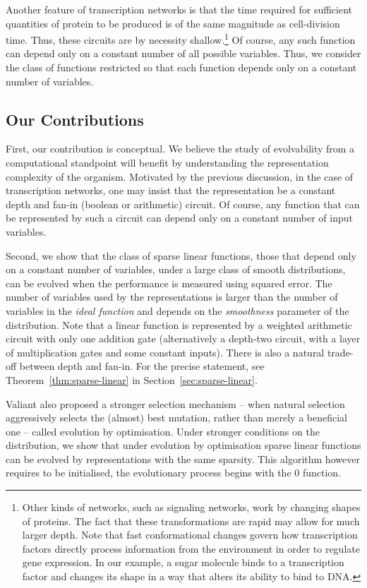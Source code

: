 Another feature of transcription networks is that the time required for
sufficient quantities of protein to be produced is of the same magnitude as
cell-division time. Thus, these circuits are by necessity
shallow.\footnote{Other kinds of networks, such as signaling networks, work by
changing shapes of proteins. The fact that these transformations are rapid may
allow for much larger depth.
Note that fast conformational changes govern how transcription factors directly
process information from the environment in order to regulate gene expression.
In our example, a sugar molecule binds to a transcription factor and changes
its shape in a way that alters its ability to bind to DNA.}
Of course, any such function can depend only on a
constant number of all possible variables. Thus, we consider the class of
functions restricted so that each function depends only on a constant number of
variables.

\subsection{Our Contributions}

First, our contribution is conceptual. We believe the study of evolvability from
a computational standpoint will benefit by understanding the representation
complexity of the organism. Motivated by the previous discussion, in the case of
transcription networks, one may insist that the representation be a
constant depth and fan-in (boolean or arithmetic) circuit. Of course, any
function that can be represented by such a circuit can depend only on a constant
number of input variables.

Second, we show that the class of sparse linear functions, those that depend
only on a constant number of variables, under a large class of smooth
distributions, can be evolved when the performance is
measured using squared error. The number of variables used by the
representations is larger than the number of variables in the \emph{ideal
function} and depends on the \emph{smoothness} parameter of the distribution.
Note that a linear function is represented by a weighted arithmetic circuit with
only one addition gate (alternatively a depth-two circuit, with a layer of
multiplication gates and some constant inputs). There is also a natural
trade-off between depth and fan-in. For the precise statement, see
Theorem~\ref{thm:sparse-linear} in Section~\ref{sec:sparse-linear}.

Valiant also proposed a stronger selection mechanism -- when natural selection
aggressively selects the (almost) best mutation, rather than merely a beneficial
one -- called evolution by optimisation.  Under stronger conditions on the
distribution, we show that under evolution by optimisation sparse linear
functions can be evolved by representations with the same sparsity. This
algorithm however requires to be initialised, \ie the evolutionary process
begins with the $0$ function.

